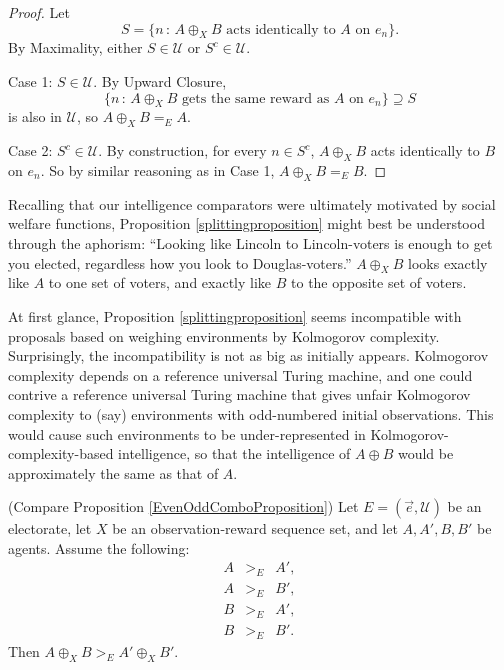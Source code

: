 \documentclass[twoside,11pt]{article}
\begin{document}
\begin{proof}
    Let
    \[
        S = \{n\,:\,\mbox{$A\oplus_X B$ acts identically to $A$ on $e_n$}\}.
    \]
    By Maximality, either $S\in\mathscr U$ or $S^c\in\mathscr U$.

    Case 1: $S\in\mathscr U$.
    By Upward Closure,
    \[
        \{n\,:\,\mbox{$A\oplus_X B$ gets the same reward as $A$ on $e_n$}\}
        \supseteq
        S
    \]
    is also in $\mathscr U$, so $A\oplus_X B =_{E} A$.

    Case 2: $S^c\in\mathscr U$.
    By construction, for every $n\in S^c$, $A\oplus_X B$ acts identically to $B$ on $e_n$.
    So by similar reasoning as in Case 1, $A\oplus_X B =_{E} B$.
\end{proof}

Recalling that our intelligence comparators were ultimately motivated by
social welfare functions,
Proposition \ref{splittingproposition} might best be understood through
the aphorism: ``Looking like Lincoln to Lincoln-voters is
enough to get you elected, regardless how you look to Douglas-voters.''
$A\oplus_X B$ looks exactly like $A$ to one set of voters, and exactly like
$B$ to the opposite set of voters.

At first glance, Proposition \ref{splittingproposition} seems incompatible with
proposals based on weighing environments by Kolmogorov complexity. Surprisingly,
the incompatibility is not as big as initially appears.
Kolmogorov complexity depends on a reference universal Turing machine, and one could
contrive a reference universal Turing machine that gives unfair Kolmogorov complexity
to (say) environments with odd-numbered initial observations. This would cause
such environments to be under-represented in Kolmogorov-complexity-based intelligence,
so that the intelligence of $A\oplus B$ would be approximately the same as that of
$A$.


\begin{proposition}
\label{GeneralizedComboProposition}
    (Compare Proposition \ref{EvenOddComboProposition})
    Let $E=(\vec{e},\mathscr U)$ be an electorate,
    let $X$ be an observation-reward sequence set,
    and let $A,A',B,B'$ be agents.
    Assume the following:
    \begin{eqnarray*}
        A &{>_{E}}& A',\\
        A &{>_{E}}& B',\\
        B &{>_{E}}& A',\\
        B &{>_{E}}& B'.
    \end{eqnarray*}
    Then $A\oplus_X B>_{E} A'\oplus_X B'$.
\end{proposition}
\end{document}
